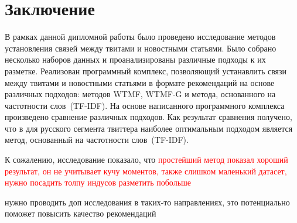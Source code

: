 \section{Заключение}
    В рамках данной дипломной работы было проведено исследование методов установления связей между твитами и новостными статьями.
    Было собрано несколько наборов данных и проанализированы различные подходы к их разметке.
    Реализован программный комплекс, позволяющий устанавлить связи между твитами и новостными статьями в формате рекомендаций на основе различных подходов: методов WTMF, WTMF-G и метода, основанного на частотности слов~(TF-IDF).
    На основе написанного программного комплекса произведено сравнение различных подходов. Как результат сравнения получено, что в для русского сегмента твиттера наиболее оптимальным подходом является метод, основанный на частотности слов~(TF-IDF).

    К сожалению, исследование показало, что \textcolor{red}{простейший метод показал хороший результат, он не учитывает кучу моментов, также слишком маленький датасет, нужно посадить толпу индусов разметить побольше}

    \textcolor{ref}{ нужно проводить доп исследования в таких-то направлениях, это потенциально поможет повысить качество рекомендаций}

    
